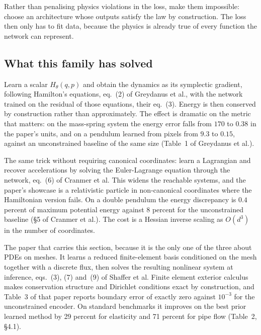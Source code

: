 \documentclass[11pt, a4paper]{article}
\begin{document}
Rather than penalising physics violations in the loss, make them
impossible: choose an architecture whose outputs satisfy the law by
construction. The loss then only has to fit data, because the physics is
already true of every function the network can represent.

\subsection{What this family has solved}

\begin{description}[style=nextline]
  \item[Greydanus, Dzamba and Yosinski, Hamiltonian networks~\citep{hnn}]
  Learn a scalar $H_\theta(q, p)$ and obtain the dynamics as its symplectic
  gradient, following Hamilton's equations, eq.~(2) of Greydanus et al., with
  the network trained on the residual of those equations, their eq.~(3).
  Energy is then conserved by construction rather than approximately. The
  effect is dramatic on the metric that matters: on the mass-spring system
  the energy error falls from $170$ to $0.38$ in the paper's units, and on a
  pendulum learned from pixels from $9.3$ to $0.15$, against an unconstrained
  baseline of the same size (Table~1 of Greydanus et al.).
  \item[Cranmer et al., Lagrangian networks~\citep{lnn}]
  The same trick without requiring canonical coordinates: learn a Lagrangian
  and recover accelerations by solving the Euler-Lagrange equation through
  the network, eq.~(6) of Cranmer et al. This widens the reachable systems,
  and the paper's showcase is a relativistic particle in non-canonical
  coordinates where the Hamiltonian version fails. On a double pendulum the
  energy discrepancy is $0.4$ percent of maximum potential energy against
  $8$ percent for the unconstrained baseline (\S{}5 of Cranmer et al.). The cost
  is a Hessian inverse scaling as $O(d^3)$ in the number of coordinates.
  \item[Shaffer et al., structure-preserving neural PDEs~\citep{structpreserving}]
  The paper that carries this section, because it is the only one of the
  three about PDEs on meshes. It learns a reduced finite-element basis
  conditioned on the mesh together with a discrete flux, then solves the
  resulting nonlinear system at inference, eqs.~(3), (7) and~(9) of Shaffer
  et al. Finite element exterior calculus makes conservation structure and
  Dirichlet conditions exact by construction, and Table~3 of that paper
  reports boundary error of exactly zero against $10^{-3}$ for the
  unconstrained encoder. On standard benchmarks it improves on the best prior
  learned method by 29 percent for elasticity and 71 percent for pipe flow
  (Table~2, \S{}4.1).
\end{description}
\end{document}
